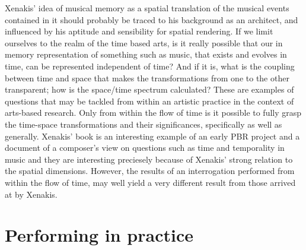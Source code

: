 Xenakis' idea of musical memory as a spatial translation of the musical events contained in it should probably be traced to his background as an architect, and influenced by his aptitude and sensibility for spatial rendering. If we limit ourselves to the realm of the time based arts, is it really possible that our in memory representation of something such as music, that exists and evolves in time, can be represented independent of time? And if it is, what is the coupling between time and space that makes the transformations from one to the other transparent; how is the space/time spectrum calculated? These are examples of questions that may be tackled from within an artistic practice in the context of arts-based research. Only from within the flow of time is it possible to fully grasp the time-space transformations and their significances, specifically as well as generally. Xenakis' book  is an interesting example of an early PBR project and a document of a composer's view on questions such as time and temporality in music and they are interesting preciesely because of Xenakis' strong relation to the spatial dimensions. However, the results of an interrogation performed from within the flow of time, may well yield a very different result from those arrived at by Xenakis. 



\section{Performing in practice}
\label{sec:performing-practice}

